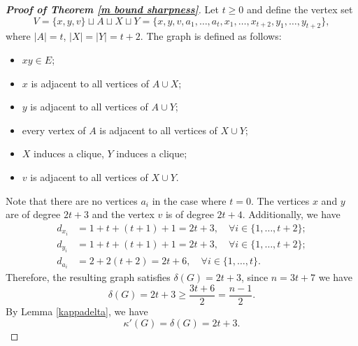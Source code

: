 \documentclass[11pt,bezier]{article}
\theoremstyle{definition}
\theoremstyle{definition}
\theoremstyle{nonumber}
\begin{document}
\begin{proof}[\bf{Proof of Theorem \ref{m bound sharpness}}]
Let $t\geq0$ and define the vertex set
$$
V =\{x,y,v\}\sqcup A \sqcup X \sqcup Y = \{x, y, v, a_1, \dots, a_t, x_1, \dots, x_{t+2}, y_1, \dots, y_{t+2}\},
$$
where $|A|=t$, $|X|=|Y|=t+2$.
The graph is defined as follows:
\begin{itemize}
\item $xy\in E$;
\item $x$ is adjacent to all vertices of $A\cup X$;
\item $y$ is adjacent to all vertices of $A\cup Y$;
\item every vertex of $A$ is adjacent to all vertices of $X\cup Y$;
\item $X$ induces a clique, $Y$ induces a clique;
\item $v$ is adjacent to all vertices of $X\cup Y$.
\end{itemize}
Note that there are no vertices $a_i$ in the case where $t = 0$. The vertices $x$ and $y$ are of degree $2t+3$ and the vertex $v$ is of degree $2t+4$.
Additionally, we have
\begin{align*}
d_{x_i} &= 1 + t + (t+1) + 1= 2t+3,\quad \forall i \in \{1, \dots, t+2\};\\
d_{y_i} &= 1 + t + (t+1) + 1= 2t+3,\quad \forall i \in \{1, \dots, t+2\};\\
d_{a_i} &= 2 + 2(t+2)= 2t + 6,\quad \forall i \in \{1, \dots, t\}.
\end{align*}
Therefore, the resulting graph satisfies $\delta(G) = 2t+3$, since $n = 3t + 7$ we have
$$
\delta(G) =2t+3\geq \frac{3t+6}{2} =\frac{n-1}{2}.
$$
By Lemma \ref{kappadelta}, we have
$$\kappa'(G)=\delta(G)=2t+3.$$


\end{proof}
\end{document}
